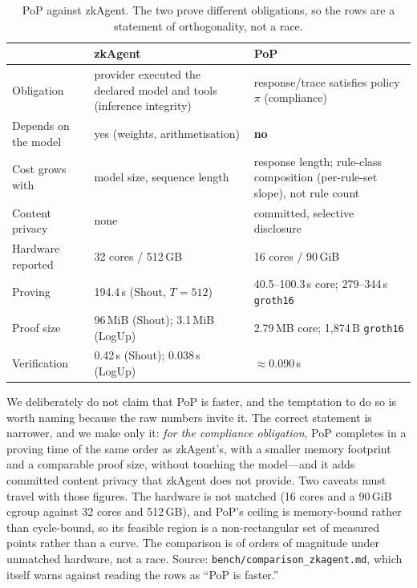 \documentclass[10pt,journal,compsoc]{IEEEtran}
\newcommand{\tabfont}{\footnotesize}
\begin{document}
\begin{table}[t]
\centering
\caption{PoP against zkAgent. The two prove different obligations, so the rows
are a statement of orthogonality, not a race.}
\label{tab:zkagent}
\tabfont
\setlength{\tabcolsep}{3pt}
\begin{tabular}{@{}L{0.22\columnwidth}L{0.38\columnwidth}L{0.30\columnwidth}@{}}
\toprule
& \textbf{zkAgent} \cite{zkagent} & \textbf{PoP} \\
\midrule
Obligation & provider executed the declared model and tools (inference integrity)
& response/trace satisfies policy $\pi$ (compliance) \\
Depends on the model & yes (weights, arithmetisation) & \textbf{no} \\
Cost grows with & model size, sequence length & response length; rule-class
composition (per-rule-set slope), not rule count \\
Content privacy & none & committed, selective disclosure \\
Hardware reported & 32 cores / 512\,GB & 16 cores / 90\,GiB \\
Proving & 194.4\,s (Shout, $T{=}512$) & 40.5--100.3\,s core; 279--344\,s \texttt{gr\-oth16} \\
Proof size & 96\,MiB (Shout); 3.1\,MiB (LogUp) & 2.79\,MB core; 1{,}874\,B \texttt{gr\-oth16} \\
Verification & 0.42\,s (Shout); 0.038\,s (LogUp) & $\approx$0.090\,s \\
\bottomrule
\end{tabular}
\end{table}

We deliberately do not claim that PoP is faster, and the temptation to do so is
worth naming because the raw numbers invite it. The correct statement is
narrower, and we make only it: \emph{for the compliance obligation}, PoP
completes in a proving time of the same order as zkAgent's, with a smaller memory
footprint and a comparable proof size, without touching the model---and it adds
committed content privacy that zkAgent does not provide. Two caveats must travel
with those figures. The hardware is not matched (16 cores and a 90\,GiB cgroup
against 32 cores and 512\,GB), and PoP's ceiling is memory-bound rather than
cycle-bound, so its feasible region is a non-rectangular set of measured points
rather than a curve. The comparison is of orders of magnitude under unmatched
hardware, not a race. Source: \texttt{bench/comparison\_zkagent.md}, which
itself warns against reading the rows as ``PoP is faster.''
\end{document}
